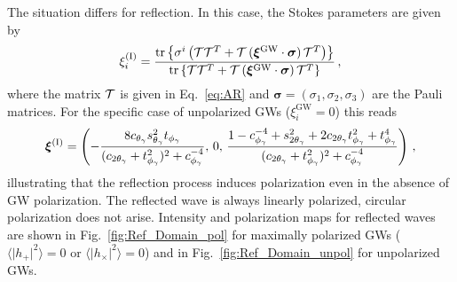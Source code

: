 \documentclass[a4paper,11pt]{article}
\begin{document}
The situation differs for reflection.
%
In this case, the Stokes parameters are given by
%
\begin{align}
\label{eq:xiasofT}
  \xi^{(\text{I})}_i = \frac{\text{tr} \left\{ \sigma^i \left( {\cal T} {\cal T}^T + {\cal T} \, (\bm{\xi}^{\text{GW}} \cdot \bm{\sigma}) \, {\cal T}^T \right) \right\}}
{\text{tr} \left\{ {\cal T} {\cal T}^T + {\cal T} \, (\bm{\xi}^{\text{GW}} \cdot \bm{\sigma}) \, {\cal T}^T \right\}}   \,,
\end{align}
where the matrix ${\cal T}$ is given in Eq.~\eqref{eq:AR} and $ \bm{\sigma} = (\sigma_{1}, \sigma_{2}, \sigma_{3})$ are the Pauli matrices. 
%
For the specific case of unpolarized GWs ($\xi^{\text{GW}}_i = 0$) this reads
%
\begin{equation}
    \begin{aligned}
     \bm{\xi}^{\rm (I)} = \left(  
          - \frac{ 8 c_{\theta_{\gamma}}
          s_{\theta_{\gamma}}^{2}
          t_{\phi_{\gamma}}   }{  ( c_{2\theta_{\gamma}} + t^{2}_{\phi_{\gamma} } )^{2} + c_{\phi_{\gamma}}^{-4} } , \,  0 , \, \frac{ 
1 - c_{\phi_{\gamma}}^{-4} + s_{2\theta_{\gamma}}^{2} + 2 c_{2\theta_{\gamma}} t_{\phi_{\gamma}}^{2} + t_{\phi_{\gamma}}^{4}
}{  ( c_{2\theta_{\gamma}} + t^{2}_{\phi_{\gamma} } )^{2} + c_{\phi_{\gamma}}^{-4} } \right) \,,
\end{aligned}
\end{equation}
%
illustrating that the reflection process induces polarization even in the absence of GW polarization. The reflected wave is always linearly polarized, circular polarization does not arise. Intensity and polarization maps for reflected waves are shown in Fig.~\ref{fig:Ref_Domain_pol} for maximally polarized GWs ($ \langle \vert h_{+} \vert^{2} \rangle =  0$ or $ \langle \vert h_{\times} \vert^{2} \rangle =  0$) and in Fig.~\ref{fig:Ref_Domain_unpol} for unpolarized GWs.
\end{document}
